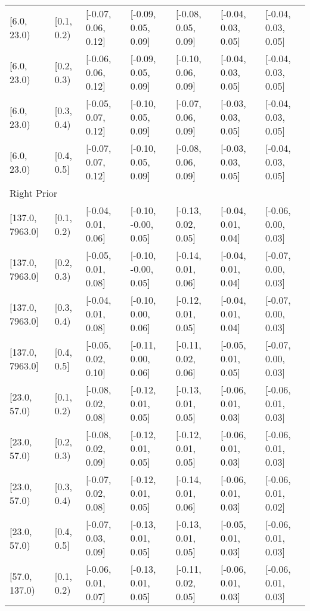\begin{table}[ht]
\begin{tabular}{lllllll}
  {[6.0, 23.0)} & {[0.1, 0.2)} & {[-0.07, 0.06, 0.12]} & {[-0.09, 0.05, 0.09]} & {[-0.08, 0.05, 0.09]} & {[-0.04, 0.03, 0.05]} & {[-0.04, 0.03, 0.05]} \\ 
  {[6.0, 23.0)} & {[0.2, 0.3)} & {[-0.06, 0.06, 0.12]} & {[-0.09, 0.05, 0.09]} & {[-0.10, 0.06, 0.09]} & {[-0.04, 0.03, 0.05]} & {[-0.04, 0.03, 0.05]} \\ 
  {[6.0, 23.0)} & {[0.3, 0.4)} & {[-0.05, 0.07, 0.12]} & {[-0.10, 0.05, 0.09]} & {[-0.07, 0.06, 0.09]} & {[-0.03, 0.03, 0.05]} & {[-0.04, 0.03, 0.05]} \\ 
  {[6.0, 23.0)} & {[0.4, 0.5]} & {[-0.07, 0.07, 0.12]} & {[-0.10, 0.05, 0.09]} & {[-0.08, 0.06, 0.09]} & {[-0.03, 0.03, 0.05]} & {[-0.04, 0.03, 0.05]} \\ 
   \midrule
\multicolumn{7}{l}{Right Prior}\\
{[137.0, 7963.0]} & {[0.1, 0.2)} & {[-0.04, 0.01, 0.06]} & {[-0.10, -0.00, 0.05]} & {[-0.13, 0.02, 0.05]} & {[-0.04, 0.01, 0.04]} & {[-0.06, 0.00, 0.03]} \\ 
  {[137.0, 7963.0]} & {[0.2, 0.3)} & {[-0.05, 0.01, 0.08]} & {[-0.10, -0.00, 0.05]} & {[-0.14, 0.01, 0.06]} & {[-0.04, 0.01, 0.04]} & {[-0.07, 0.00, 0.03]} \\ 
  {[137.0, 7963.0]} & {[0.3, 0.4)} & {[-0.04, 0.01, 0.08]} & {[-0.10, 0.00, 0.06]} & {[-0.12, 0.01, 0.05]} & {[-0.04, 0.01, 0.04]} & {[-0.07, 0.00, 0.03]} \\ 
  {[137.0, 7963.0]} & {[0.4, 0.5]} & {[-0.05, 0.02, 0.10]} & {[-0.11, 0.00, 0.06]} & {[-0.11, 0.02, 0.06]} & {[-0.05, 0.01, 0.05]} & {[-0.07, 0.00, 0.03]} \\ 
  {[23.0, 57.0)} & {[0.1, 0.2)} & {[-0.08, 0.02, 0.08]} & {[-0.12, 0.01, 0.05]} & {[-0.13, 0.01, 0.05]} & {[-0.06, 0.01, 0.03]} & {[-0.06, 0.01, 0.03]} \\ 
  {[23.0, 57.0)} & {[0.2, 0.3)} & {[-0.08, 0.02, 0.09]} & {[-0.12, 0.01, 0.05]} & {[-0.12, 0.01, 0.05]} & {[-0.06, 0.01, 0.03]} & {[-0.06, 0.01, 0.03]} \\ 
  {[23.0, 57.0)} & {[0.3, 0.4)} & {[-0.07, 0.02, 0.08]} & {[-0.12, 0.01, 0.05]} & {[-0.14, 0.01, 0.06]} & {[-0.06, 0.01, 0.03]} & {[-0.06, 0.01, 0.02]} \\ 
  {[23.0, 57.0)} & {[0.4, 0.5]} & {[-0.07, 0.03, 0.09]} & {[-0.13, 0.01, 0.05]} & {[-0.13, 0.01, 0.05]} & {[-0.05, 0.01, 0.03]} & {[-0.06, 0.01, 0.03]} \\ 
  {[57.0, 137.0)} & {[0.1, 0.2)} & {[-0.06, 0.01, 0.07]} & {[-0.13, 0.01, 0.05]} & {[-0.11, 0.02, 0.05]} & {[-0.06, 0.01, 0.03]} & {[-0.06, 0.01, 0.03]} \\ 

\end{tabular}
\end{table}
